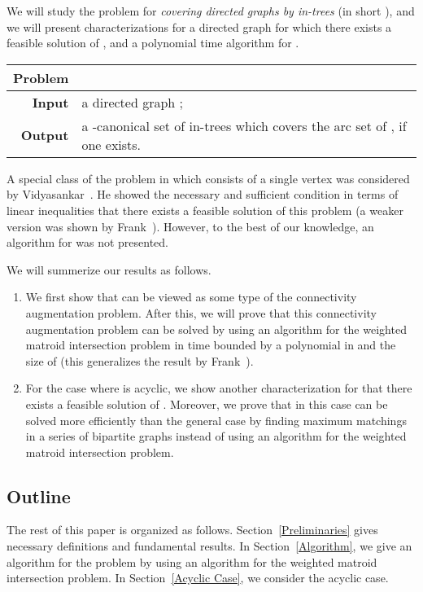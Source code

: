 \documentclass[11pt]{article}
\newcounter{ni}
\newcounter{san}
\theoremstyle{plain}
\begin{document}
We will study the problem for 
{\it covering directed graphs by in-trees} (in short ), 
and we will present characterizations for a directed graph  
for which there exists a feasible solution of , and 
a polynomial time algorithm for . 
\begin{center}
\begin{tabularx}{150mm}{rX}
\hline
{\bf Problem} &  
\\
\hline 
{\bf Input} & a directed graph ; \\
{\bf Output} &
a -canonical set of in-trees which covers the arc set of , if one exists.\\
\hline
\end{tabularx}
\end{center}
A special class of the problem  in which  consists of a single vertex 
was considered by Vidyasankar~\cite{V78}. 
He showed the necessary and sufficient condition 
in terms of linear inequalities 
that there exists a feasible solution of this problem
(a weaker version was shown by Frank~\cite{F79}).
However, to the best of our knowledge, 
an algorithm for  was not 
presented.

We will summerize our results as follows. 
\begin{enumerate}
\item 
We first show that  can be viewed as some type of 
the connectivity augmentation problem. After this, 
we will prove that 
this connectivity augmentation problem can be solved by using 
an algorithm for the weighted matroid intersection problem in time bounded by a polynomial in 
 and the size of  
(this generalizes the result by Frank~\cite{F06}). 
\item
For the case where  is acyclic, we show another characterization for  
that there exists a feasible solution of . Moreover, we prove that 
in this case  can be solved more efficiently than the general case by 
finding maximum matchings in a series of bipartite graphs instead of using 
an algorithm for the weighted matroid intersection problem. \\
\end{enumerate}

\subsection{Outline}

The rest of this paper is organized as follows. 
Section~\ref{Preliminaries} gives necessary definitions and fundamental results. 
In Section~\ref{Algorithm}, we give an algorithm for the problem 
 by using an algorithm for the weighted matroid intersection 
problem. In Section~\ref{Acyclic Case}, we consider the acyclic case. 
\end{document}
